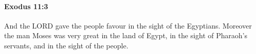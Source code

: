 
		\paragraph{Exodus 11:3} %
			\label{EXODUS-11-3}

			And the LORD gave the people favour in the sight of the Egyptians. Moreover the man Moses was very great in the land of Egypt, in the sight of Pharaoh's servants, and in the sight of the people.


